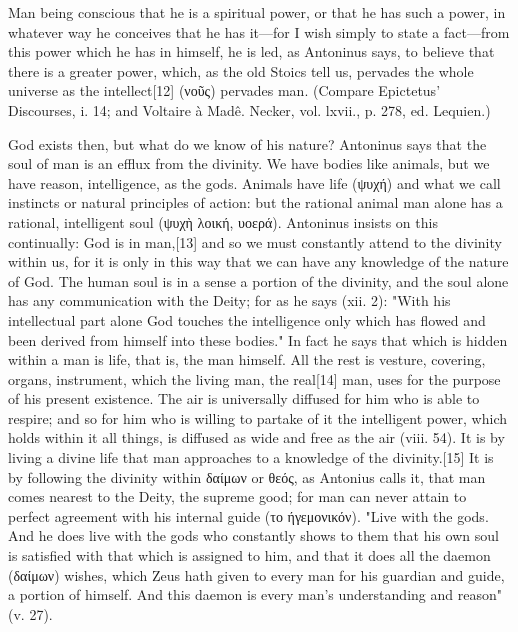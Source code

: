 Man being conscious that he is a spiritual power, or that he has such a power, in whatever way he conceives that he has it—for I wish simply to state a fact—from this power which he has in himself, he is led, as Antoninus says, to believe that there is a greater power, which, as the old Stoics tell us, pervades the whole universe as the intellect[12] (\textgreek{νοῦς}) pervades man. (Compare Epictetus' Discourses, i. 14; and Voltaire à Mad\^e. Necker, vol. lxvii., p. 278, ed. Lequien.)

God exists then, but what do we know of his nature? Antoninus says that the soul of man is an efflux from the divinity. We have bodies like animals, but we have reason, intelligence, as the gods. Animals have life (\textgreek{ψυχή}) and what we call instincts or natural principles of action: but the rational animal man alone has a rational, intelligent soul (\textgreek{ψυχὴ λοική, υοερά}). Antoninus insists on this continually: God is in man,[13] and so we must constantly attend to the divinity within us, for it is only in this way that we can have any knowledge of the nature of God. The human soul is in a sense a portion of the divinity, and the soul alone has any communication with the Deity; for as he says (xii. 2): "With his intellectual part alone God touches the intelligence only which has flowed and been derived from himself into these bodies." In fact he says that which is hidden within a man is life, that is, the man himself. All the rest is vesture, covering, organs, instrument, which the living man, the real[14] man, uses for the purpose of his present existence. The air is universally diffused for him who is able to respire; and so for him who is willing to partake of it the intelligent power, which holds within it all things, is diffused as wide and free as the air (viii. 54). It is by living a divine life that man approaches to a knowledge of the divinity.[15] It is by following the divinity within \textgreek{δαίμων} or \textgreek{θεός}, as Antonius calls it, that man comes nearest to the Deity, the supreme good; for man can never attain to perfect agreement with his internal guide (\textgreek{το ήγεμονικόν}). "Live with the gods. And he does live with the gods who constantly shows to them that his own soul is satisfied with that which is assigned to him, and that it does all the daemon (\textgreek{δαίμων}) wishes, which Zeus hath given to every man for his guardian and guide, a portion of himself. And this daemon is every man's understanding and reason" (v. 27).

